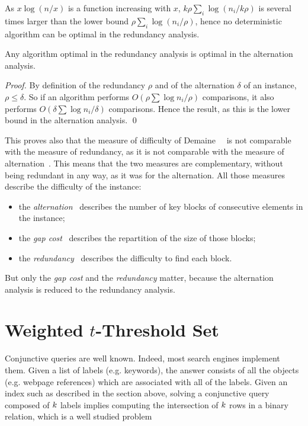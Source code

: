 %
As $x\log(n/x)$ is a function increasing with $x$,
$k\rho\sum_i\log(n_i/k\rho)$ is several times larger than the lower
bound $\rho\sum_i\log(n_i/\rho)$, hence no deterministic algorithm can
be optimal in the redundancy analysis.
%
\begin{theorem}\label{th:strictlyfiner}
Any algorithm optimal in the redundancy analysis is optimal in the
alternation analysis.
\end{theorem}
\begin{proof}
By definition of the redundancy $\rho$ and of the alternation $\delta$
of an instance, $\rho\leq\delta$.
%
So if an algorithm performs $O(\rho\sum \log{n_i/\rho})$
comparisons, it also performs $O(\delta\sum\log{n_i/\delta})$
comparisons.
%
Hence the result, as this is the lower bound in the alternation analysis.
\qed\end{proof}


This proves also that the measure of difficulty of
Demaine~\etal~\cite{dlm} is not comparable with the measure of
redundancy, as it is not comparable with the measure of
alternation~\cite[Section~2.3]{deterministicAlgorithmForTheTThresholdSetProblem}.
%
This means that the two measures are complementary, without being
redundant in any way, as it was for the alternation.
%
All those measures describe the difficulty of the instance:
\begin{itemize}
\item the {\em alternation}~\cite[Section~2.3]{deterministicAlgorithmForTheTThresholdSetProblem}
describes the number of key blocks of consecutive elements in the
instance;
\item the {\em gap cost}~\cite{dlm} describes the repartition of the
size of those blocks;
\item the {\em
redundancy}~\cite{optimalityOfRandomizedAlgorithmsForTheIntersectionProblem}
describes the difficulty to find each
block.
\end{itemize}
%
But only the {\em gap cost} and the {\em redundancy} matter, because the
alternation analysis is reduced to the redundancy analysis.



\section{Weighted $t$-Threshold Set}
\label{sec:t-threshold-set}



Conjunctive queries are well known. Indeed, most search engines
implement them.
% 
Given a list of labels (e.g.  keywords), the answer consists of all
the objects (e.g. webpage references) which are associated with all of
the labels.
%
Given an index such as described in the section above, solving a
conjunctive query composed of $k$ labels implies computing
the intersection of $k$ rows in a binary relation, which is
a well studied
problem~\cite{aFastSetIntersectionAlgorithmForSortedSequences,experimentalAnalysisOfAFastIntersectionAlgorithmForSortedSequences,dlm,dlmAlenex}


